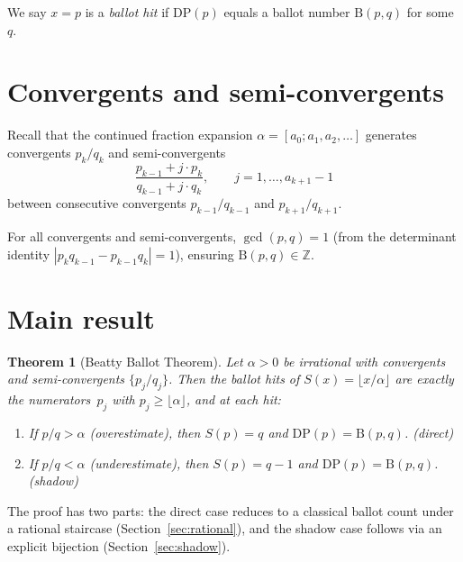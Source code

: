 \documentclass[11pt]{article}
\newtheorem{theorem}{Theorem}
\theoremstyle{definition}
\theoremstyle{remark}
\newcommand{\floor}[1]{\lfloor #1 \rfloor}
\newcommand{\B}{\mathrm{B}}
\begin{document}
We say $x = p$ is a \emph{ballot hit} if $\mathrm{DP}(p)$ equals a ballot number $\B(p, q)$ for some~$q$.

\section{Convergents and semi-convergents}

Recall that the continued fraction expansion $\alpha = [a_0; a_1, a_2, \ldots]$ generates convergents $p_k/q_k$ and semi-convergents
\begin{equation}
  \frac{p_{k-1} + j \cdot p_k}{q_{k-1} + j \cdot q_k}, \qquad j = 1, \ldots, a_{k+1} - 1
\end{equation}
between consecutive convergents $p_{k-1}/q_{k-1}$ and $p_{k+1}/q_{k+1}$.

For all convergents and semi-convergents, $\gcd(p, q) = 1$ (from the determinant identity $|p_k q_{k-1} - p_{k-1} q_k| = 1$), ensuring $\B(p, q) \in \mathbb{Z}$.

\section{Main result}

\begin{theorem}[Beatty Ballot Theorem]\label{thm:main}
Let $\alpha > 0$ be irrational with convergents and semi-convergents $\{p_j/q_j\}$. Then the ballot hits of $S(x) = \floor{x/\alpha}$ are exactly the numerators~$p_j$ with $p_j \geq \floor{\alpha}$, and at each hit:
\begin{enumerate}
  \item If $p/q > \alpha$ (overestimate), then $S(p) = q$ and $\mathrm{DP}(p) = \B(p, q)$. \hfill\emph{(direct)}
  \item If $p/q < \alpha$ (underestimate), then $S(p) = q - 1$ and $\mathrm{DP}(p) = \B(p, q)$. \hfill\emph{(shadow)}
\end{enumerate}
\end{theorem}

The proof has two parts: the direct case reduces to a classical ballot count under a rational staircase (Section~\ref{sec:rational}), and the shadow case follows via an explicit bijection (Section~\ref{sec:shadow}).
\end{document}
